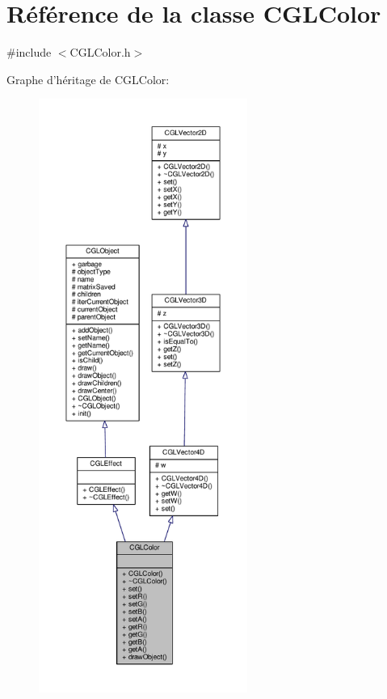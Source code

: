 \hypertarget{class_c_g_l_color}{\section{Référence de la classe C\-G\-L\-Color}
\label{class_c_g_l_color}
}


{\ttfamily \#include $<$C\-G\-L\-Color.\-h$>$}



Graphe d'héritage de C\-G\-L\-Color\-:\nopagebreak
\begin{figure}[H]
\begin{center}
\leavevmode
\includegraphics[height=550pt]{d0/d0d/class_c_g_l_color__inherit__graph}
\end{center}
\end{figure}


